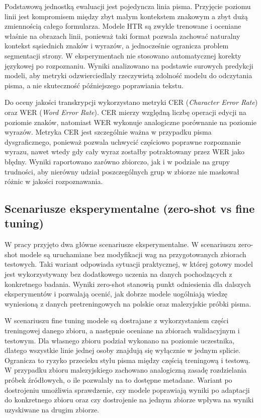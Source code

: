 Podstawową jednostką ewaluacji jest pojedyncza linia pisma. Przyjęcie poziomu linii jest
kompromisem między zbyt małym kontekstem znakowym a zbyt dużą zmiennością całego formularza.
Modele HTR są zwykle trenowane i oceniane właśnie na obrazach linii, ponieważ taki format pozwala
zachować naturalny kontekst sąsiednich znaków i wyrazów, a jednocześnie ogranicza problem
segmentacji strony. W eksperymentach nie stosowano automatycznej korekty językowej po rozpoznaniu.
Wyniki analizowano na podstawie surowych predykcji modeli, aby metryki odzwierciedlały rzeczywistą
zdolność modelu do odczytania pisma, a nie skuteczność późniejszego poprawiania tekstu.

Do oceny jakości transkrypcji wykorzystano metryki CER (\textit{Character Error Rate}) oraz WER
(\textit{Word Error Rate}). CER mierzy względną liczbę operacji edycji na poziomie znaków,
natomiast WER wykonuje analogiczne porównanie na poziomie wyrazów. Metryka CER jest szczególnie
ważna w przypadku pisma dysgraficznego, ponieważ pozwala uchwycić częściowo poprawne rozpoznanie
wyrazu, nawet wtedy gdy cały wyraz zostałby potraktowany przez WER jako błędny. Wyniki raportowano
zarówno zbiorczo, jak i w podziale na grupy trudności, aby nierówny udział poszczególnych grup
w zbiorze nie maskował różnic w jakości rozpoznawania.

\subsection{Scenariusze eksperymentalne (zero-shot vs fine tuning)}
\label{subsec:scenariusze-eksperymentalne}

W pracy przyjęto dwa główne scenariusze eksperymentalne. W scenariuszu zero-shot modele są
uruchamiane bez modyfikacji wag na przygotowanych zbiorach testowych. Taki wariant odpowiada
sytuacji praktycznej, w której gotowy model jest wykorzystywany bez dodatkowego uczenia na danych
pochodzących z konkretnego badania. Wyniki zero-shot stanowią punkt odniesienia dla dalszych
eksperymentów i pozwalają ocenić, jak dobrze modele uogólniają wiedzę wyniesioną z danych
pretreningowych na polskie oraz malezyjskie próbki pisma.

W scenariuszu fine tuning modele są dostrajane z wykorzystaniem części treningowej danego zbioru,
a następnie oceniane na zbiorach walidacyjnym i testowym. Dla własnego zbioru podział wykonano na
poziomie uczestnika, dlatego wszystkie linie jednej osoby znajdują się wyłącznie w jednym splicie.
Ogranicza to ryzyko przecieku stylu pisma między częścią treningową i testową. W przypadku zbioru
malezyjskiego zachowano analogiczną zasadę rozdzielania próbek źródłowych, o ile pozwalały na to
dostępne metadane. Wariant po dostrojeniu umożliwia sprawdzenie, czy modele poprawiają wyniki
po adaptacji do konkretnego zbioru oraz czy dostrojenie na jednym zbiorze wpływa na wyniki
uzyskiwane na drugim zbiorze.

